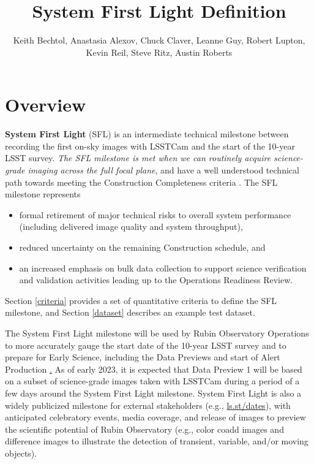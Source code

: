 \documentclass[SE,authoryear,toc,lsstdraft]{lsstdoc}
\title{System First Light Definition}
\author{%
Keith Bechtol, Anastasia Alexov, Chuck Claver, Leanne Guy, Robert Lupton, Kevin Reil, Steve Ritz, Austin Roberts
}
\date{\vcsDate}
\begin{document}
\maketitle


\section{Overview}
\label{overview}

\textbf{System First Light} (SFL) is an intermediate technical milestone between recording the first on-sky images with LSSTCam and the start of the 10-year LSST survey.
\emph{The SFL milestone is met when we can routinely acquire science-grade imaging across the full focal plane}, and have a well understood technical path towards meeting the Construction Completeness criteria .
The SFL milestone represents

\begin{itemize}
  \item formal retirement of major technical risks to overall system performance (including delivered image quality and system throughput),
  \item reduced uncertainty on the remaining Construction schedule, and
  \item an increased emphasis on bulk data collection to support science verification and validation activities leading up to the Operations Readiness Review.
\end{itemize}

Section \ref{criteria} provides a set of quantitative criteria to define the SFL milestone, and Section \ref{dataset} describes an example test dataset.

The System First Light milestone will be used by Rubin Observatory Operations to more accurately gauge the start date of the 10-year LSST survey and to prepare for Early Science, including the Data Previews and start of Alert Production  \href{https://rtn-011.lsst.io/}.
As of early 2023, it is expected that Data Preview 1 will be based on a subset of science-grade images taken with LSSTCam during a period of a few days around the System First Light milestone.
System First Light is also a widely publicized milestone for external stakeholders (e.g., \href{https://ls.st/dates}{ls.st/dates}), with anticipated celebratory events, media coverage, and release of images to preview the scientific potential of Rubin Observatory (e.g., color coadd images and difference images to illustrate the detection of transient, variable, and/or moving objects).
\end{document}
